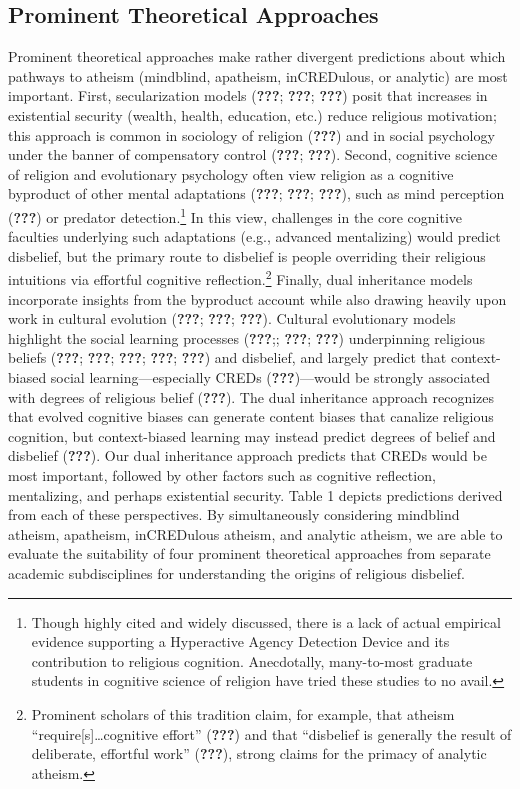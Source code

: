 \documentclass[english,man,mask]{article}
\begin{document}
\hypertarget{prominent-theoretical-approaches}{%
\subsection{Prominent Theoretical Approaches}\label{prominent-theoretical-approaches}}

Prominent theoretical approaches make rather divergent predictions about which pathways to atheism (mindblind, apatheism, inCREDulous, or analytic) are most important. First, secularization models ({\textbf{???}}; {\textbf{???}}; {\textbf{???}}) posit that increases in existential security (wealth, health, education, etc.) reduce religious motivation; this approach is common in sociology of religion ({\textbf{???}}) and in social psychology under the banner of compensatory control ({\textbf{???}}; {\textbf{???}}). Second, cognitive science of religion and evolutionary psychology often view religion as a cognitive byproduct of other mental adaptations ({\textbf{???}}; {\textbf{???}}; {\textbf{???}}), such as mind perception ({\textbf{???}}) or predator detection.\footnote{Though highly cited and widely discussed, there is a lack of actual empirical evidence supporting a Hyperactive Agency Detection Device and its contribution to religious cognition. Anecdotally, many-to-most graduate students in cognitive science of religion have tried these studies to no avail.} In this view, challenges in the core cognitive faculties underlying such adaptations (e.g., advanced mentalizing) would predict disbelief, but the primary route to disbelief is people overriding their religious intuitions via effortful cognitive reflection.\footnote{Prominent scholars of this tradition claim, for example, that atheism \enquote{require{[}s{]}\ldots{}cognitive effort} ({\textbf{???}}) and that \enquote{disbelief is generally the result of deliberate, effortful work} ({\textbf{???}}), strong claims for the primacy of analytic atheism.} Finally, dual inheritance models incorporate insights from the byproduct account while also drawing heavily upon work in cultural evolution ({\textbf{???}}; {\textbf{???}}; {\textbf{???}}). Cultural evolutionary models highlight the social learning processes ({\textbf{???}};; {\textbf{???}}; {\textbf{???}}) underpinning religious beliefs ({\textbf{???}}; {\textbf{???}}; {\textbf{???}}; {\textbf{???}}; {\textbf{???}}) and disbelief, and largely predict that context-biased social learning---especially CREDs ({\textbf{???}})---would be strongly associated with degrees of religious belief ({\textbf{???}}). The dual inheritance approach recognizes that evolved cognitive biases can generate content biases that canalize religious cognition, but context-biased learning may instead predict degrees of belief and disbelief ({\textbf{???}}). Our dual inheritance approach predicts that CREDs would be most important, followed by other factors such as cognitive reflection, mentalizing, and perhaps existential security. Table 1 depicts predictions derived from each of these perspectives. By simultaneously considering mindblind atheism, apatheism, inCREDulous atheism, and analytic atheism, we are able to evaluate the suitability of four prominent theoretical approaches from separate academic subdisciplines for understanding the origins of religious disbelief.
\end{document}
